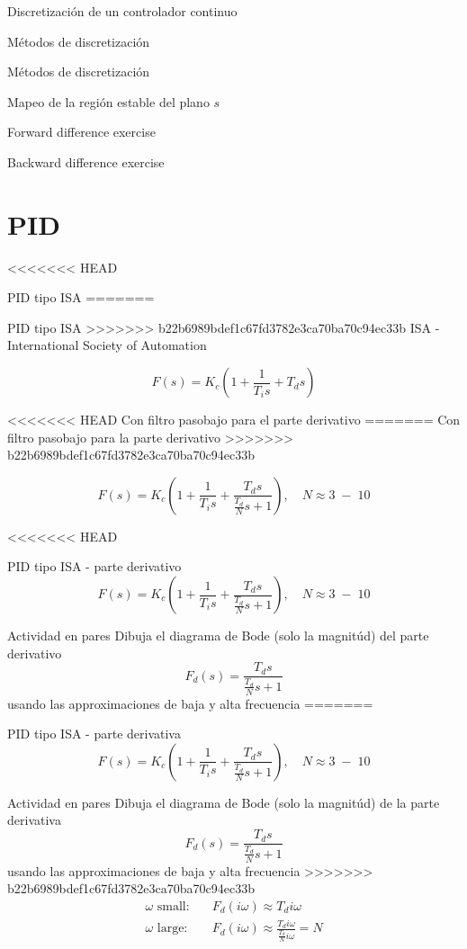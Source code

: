 \documentclass[presentation,aspectratio=1610]{beamer}
\begin{document}
\begin{frame}[label={sec:org86d23da}]{Discretización de un controlador continuo}
\begin{frame}[label={sec:org3ca2082}]{Métodos de discretización}
\begin{frame}[label={sec:orga78cff2}]{Métodos de discretización}
\begin{frame}[label={sec:org28bff53}]{Mapeo de la región estable del plano \(s\)}
\begin{frame}[label={sec:org9bb57fa}]{Forward difference exercise}
\begin{frame}[label={sec:orgaf8c1b0}]{Backward difference exercise}
\section{PID}
<<<<<<< HEAD
\label{sec:org5a7a827}
\begin{frame}[label={sec:orgb2215e6}]{PID tipo ISA}
=======
\label{sec:orgbe0adf6}
\begin{frame}[label={sec:org1bc6757}]{PID tipo ISA}
>>>>>>> b22b6989bdef1c67fd3782e3ca70ba70c94ec33b
ISA - International Society of Automation

\[ F(s) = K_c\left( 1 + \frac{1}{T_i s} + T_d s\right) \]

<<<<<<< HEAD
Con filtro pasobajo para el parte derivativo
=======
Con filtro pasobajo para la parte derivativo
>>>>>>> b22b6989bdef1c67fd3782e3ca70ba70c94ec33b

\[ F(s) = K_c\left( 1 + \frac{1}{T_i s} + \frac{T_d s}{\frac{T_d}{N} s + 1}\right), \quad N \approx 3\; - \; 10 \]
\end{frame}

<<<<<<< HEAD
\begin{frame}[label={sec:orga06296a}]{PID tipo ISA - parte derivativo}
\[ F(s) = K_c\left( 1 + \frac{1}{T_i s} + \frac{T_d s}{\frac{T_d}{N} s + 1}\right), \quad N \approx 3\; - \; 10 \]

\alert{Actividad en pares} Dibuja el diagrama de Bode (solo la magnitúd)  del parte derivativo \[F_d(s) = \frac{T_d s}{\frac{T_d}{N} s + 1}\] usando las approximaciones de baja y alta frecuencia
=======
\begin{frame}[label={sec:orga3e8392}]{PID tipo ISA - parte derivativa}
\[ F(s) = K_c\left( 1 + \frac{1}{T_i s} + \frac{T_d s}{\frac{T_d}{N} s + 1}\right), \quad N \approx 3\; - \; 10 \]

\alert{Actividad en pares} Dibuja el diagrama de Bode (solo la magnitúd)  de la parte derivativa \[F_d(s) = \frac{T_d s}{\frac{T_d}{N} s + 1}\] usando las approximaciones de baja y alta frecuencia
>>>>>>> b22b6989bdef1c67fd3782e3ca70ba70c94ec33b
\begin{align*}
 \text{$\omega$ small:} \quad & F_d(i\omega) \approx T_d i\omega \\
 \text{$\omega$ large:} \quad & F_d(i\omega) \approx \frac{T_d i \omega }{\frac{T_d}{N} i\omega} = N
\end{align*}
\end{frame}


\end{frame}
\end{frame}
\end{frame}
\end{frame}
\end{frame}
\end{frame}
\end{frame}
\end{frame}
\end{document}
